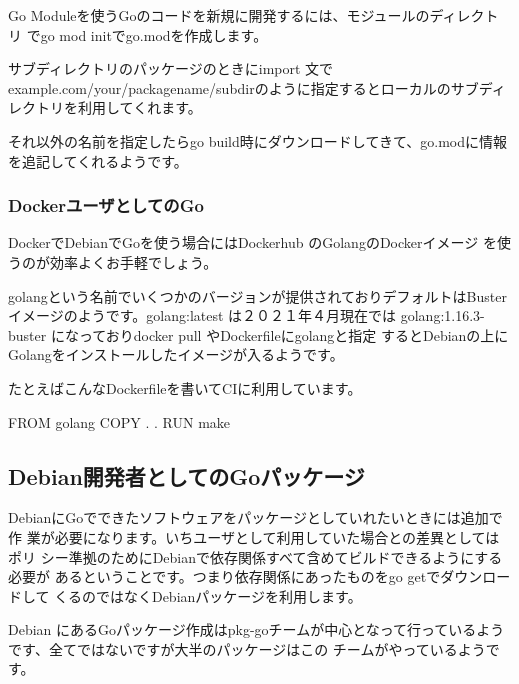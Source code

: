 \documentclass[mingoth,a4paper]{jsarticle}
\begin{document}
Go Moduleを使うGoのコードを新規に開発するには、モジュールのディレクトリ
でgo mod initでgo.modを作成します。


サブディレクトリのパッケージのときにimport 文で
example.com/your/packagename/subdirのように指定するとローカルのサブディ
レクトリを利用してくれます。

それ以外の名前を指定したらgo build時にダウンロードしてきて、go.modに情報
を追記してくれるようです。

\subsubsection{DockerユーザとしてのGo}

DockerでDebianでGoを使う場合にはDockerhub のGolangのDockerイメージ
\cite{docker:go}を使うのが効率よくお手軽でしょう。

golangという名前でいくつかのバージョンが提供されておりデフォルトはBuster
イメージのようです。golang:latest は２０２１年４月現在では
golang:1.16.3-buster になっておりdocker pull やDockerfileにgolangと指定
するとDebianの上にGolangをインストールしたイメージが入るようです。

たとえばこんなDockerfileを書いてCIに利用しています。

\begin{commandline}
FROM golang
COPY . .
RUN make
\end{commandline}


\subsection{Debian開発者としてのGoパッケージ}

DebianにGoでできたソフトウェアをパッケージとしていれたいときには追加で作
業が必要になります。いちユーザとして利用していた場合との差異としてはポリ
シー準拠のためにDebianで依存関係すべて含めてビルドできるようにする必要が
あるということです。つまり依存関係にあったものをgo getでダウンロードして
くるのではなくDebianパッケージを利用します。

Debian にあるGoパッケージ作成はpkg-goチームが中心となって行っているよう
です\cite{debian-go-packaging}、全てではないですが大半のパッケージはこの
チームがやっているようです。
\end{document}
